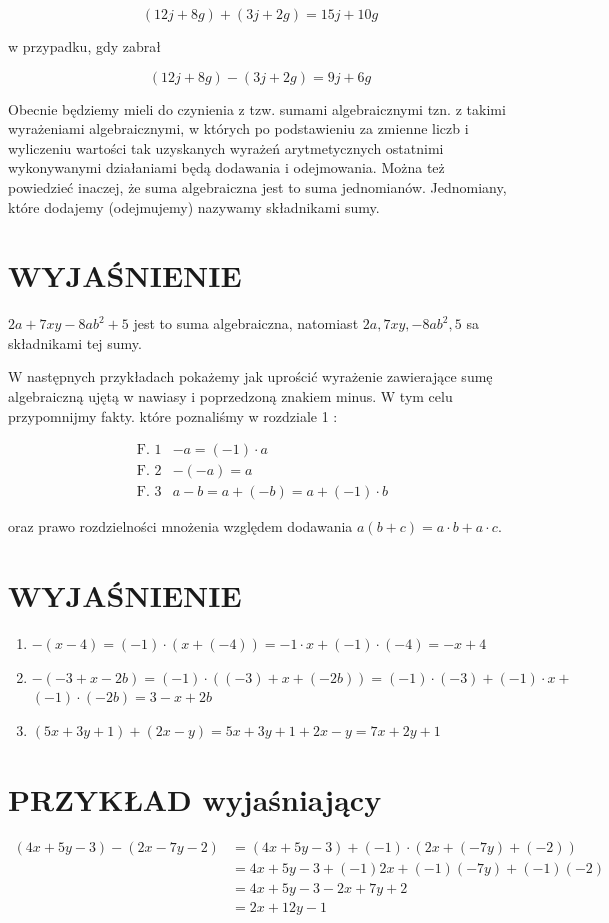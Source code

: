 \documentclass[10pt]{article}
\begin{document}
\[
(12 j+8 g)+(3 j+2 g)=15 j+10 g
\]

w przypadku, gdy zabrał

\[
(12 j+8 g)-(3 j+2 g)=9 j+6 g
\]

Obecnie będziemy mieli do czynienia z tzw. sumami algebraicznymi tzn. z takimi wyrażeniami algebraicznymi, w których po podstawieniu za zmienne liczb i wyliczeniu wartości tak uzyskanych wyrażeń arytmetycznych ostatnimi wykonywanymi działaniami będą dodawania i odejmowania. Można też powiedzieć inaczej, że suma algebraiczna jest to suma jednomianów. Jednomiany, które dodajemy (odejmujemy) nazywamy składnikami sumy.

\section*{WYJAŚNIENIE}
\(2 a+7 x y-8 a b^{2}+5\) jest to suma algebraiczna, natomiast \(2 a, 7 x y,-8 a b^{2}, 5\) sa składnikami tej sumy.

W następnych przykładach pokażemy jak uprościć wyrażenie zawierające sumę algebraiczną ujętą w nawiasy i poprzedzoną znakiem minus. W tym celu przypomnijmy fakty. które poznaliśmy w rozdziale 1 :

\[
\begin{array}{ll}
\text { F. } 1 & -a=(-1) \cdot a \\
\text { F. } 2 & -(-a)=a \\
\text { F. } 3 & a-b=a+(-b)=a+(-1) \cdot b
\end{array}
\]

oraz prawo rozdzielności mnożenia względem dodawania \(a(b+c)=a \cdot b+a \cdot c\).

\section*{WYJAŚNIENIE}
\begin{enumerate}
  \item \(-(x-4)=(-1) \cdot(x+(-4))=-1 \cdot x+(-1) \cdot(-4)=-x+4\)
  \item \(-(-3+x-2 b)=(-1) \cdot((-3)+x+(-2 b))=(-1) \cdot(-3)+(-1) \cdot x+\) \((-1) \cdot(-2 b)=3-x+2 b\)
  \item \((5 x+3 y+1)+(2 x-y)=5 x+3 y+1+2 x-y=7 x+2 y+1\)
\end{enumerate}

\section*{PRZYKŁAD wyjaśniający}
\[
\begin{aligned}
(4 x+5 y-3)-(2 x-7 y-2) & =(4 x+5 y-3)+(-1) \cdot(2 x+(-7 y)+(-2)) \\
& =4 x+5 y-3+(-1) 2 x+(-1)(-7 y)+(-1)(-2) \\
& =4 x+5 y-3-2 x+7 y+2 \\
& =2 x+12 y-1
\end{aligned}
\]
\end{document}
